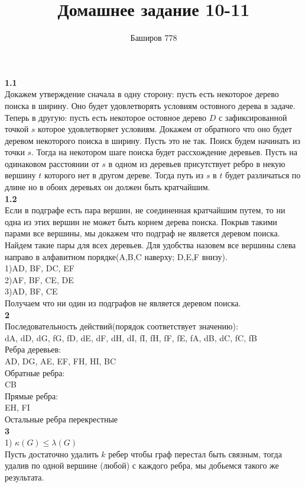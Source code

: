 \documentclass[a4paper,12pt]{article}
\author{Баширов 778}
\title{Домашнее задание 10-11}
\begin{document}
\maketitle
\newpage
\noindent \large\textbf{1.1}\normalsize\\
Докажем утверждение сначала в одну сторону: пусть есть некоторое дерево поиска в ширину. Оно будет удовлетворять условиям остовного дерева в задаче.\\
Теперь в другую: пусть есть некоторое остовное дерево $D$ с зафиксированной точкой $s$ которое удовлетворяет условиям. Докажем от обратного что оно будет деревом некоторого поиска в ширину. Пусть это не так. Поиск будем начинать из точки $s$. Тогда на некотором шаге поиска будет рассхождение деревьев. Пусть на одинаковом расстоянии от $s$ в одном из деревьев присутствует ребро в некую вершину $t$ которого нет в другом дереве. Тогда путь из $s$ в $t$ будет различаться по длине но в обоих деревьях он должен быть кратчайшим.\\
\large\textbf{1.2}\normalsize\\
Если в подграфе есть пара вершин, не соединенная кратчайшим путем, то ни одна из этих вершин не может быть корнем дерева поиска. Покрыв такими парами все вершины, мы докажем что подграф не является деревом поиска. Найдем такие пары для всех деревьев. Для удобства назовем все вершины слева направо в алфавитном порядке(A,B,C наверху; D,E,F внизу).\\
1)AD, BF, DC, EF\\
2)AF, BF, CE, DE\\
3)AD, BF, CE\\
Получаем что ни один из подграфов не является деревом поиска.\\
\large\textbf{2}\normalsize\\
Последовательность действий(порядок соответствует значению):\\
dA, dD, dG, fG, fD, dE, dF, dH, dI, fI, fH, fF, fE, fA, dB, dC, fC, fB\\
Ребра деревьев:\\
AD, DG, AE, EF, FH, HI, BC\\
Обратные ребра:\\
CB\\
Прямые ребра:\\
EH, FI\\
Остальные ребра перекрестные\\
\large\textbf{3}\normalsize\\
1) $\kappa(G) \leq \lambda(G)$\\
Пусть достаточно удалить $k$ ребер чтобы граф перестал быть связным, тогда удалив по одной вершине (любой) с каждого ребра, мы добьемся такого же результата.\\
\end{document}
